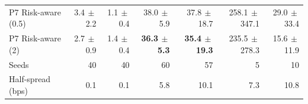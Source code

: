 \begin{table}[!htbp]
{\begin{tabular}{lrrrrrr}
P7 Risk-aware (0.5) & 3.4{\tiny$\,\pm$2.2} & 1.1{\tiny$\,\pm$0.4} & 38.0{\tiny$\,\pm$5.9} & 37.8{\tiny$\,\pm$18.7} & 258.1{\tiny$\,\pm$347.1} & 29.0{\tiny$\,\pm$33.4} \\
P7 Risk-aware (2) & 2.7{\tiny$\,\pm$0.9} & 1.4{\tiny$\,\pm$0.4} & \textbf{36.3{\tiny$\,\pm$5.3}} & \textbf{35.4{\tiny$\,\pm$19.3}} & 235.5{\tiny$\,\pm$278.3} & 15.6{\tiny$\,\pm$11.9} \\
\midrule
Seeds & 40 & 40 & 60 & 57 & 5 & 10 \\
Half-spread (bps) & 0.1 & 0.1 & 5.8 & 10.1 & 7.3 & 10.8 \\
\bottomrule
\end{tabular}}
\end{table}
